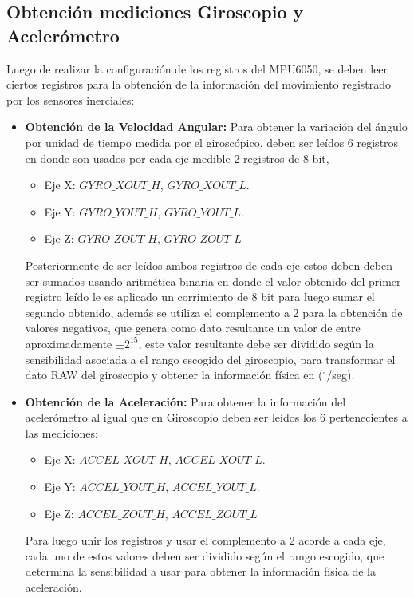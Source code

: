 \documentclass[12pt,a4paper]{article}
\newcommand{\grad}{$^{\circ}$}
\begin{document}
\subsection{Obtención mediciones Giroscopio y Acelerómetro}
Luego de realizar la configuración de los registros del MPU6050, se deben leer ciertos registros para la obtención de la información del movimiento registrado por los sensores inerciales:

\begin{itemize}
\item \textbf{Obtención de la Velocidad Angular:} Para obtener la variación del ángulo por unidad de tiempo medida por el giroscópico, deben ser leídos 6 registros en donde son usados por cada eje medible 2 registros de 8 bit,
\begin{itemize}
	\item Eje X: $GYRO\_XOUT\_H$, $GYRO\_XOUT\_L$.
	\item Eje Y: $GYRO\_YOUT\_H$, $GYRO\_YOUT\_L$.
	\item Eje Z: $GYRO\_ZOUT\_H$, $GYRO\_ZOUT\_L$
\end{itemize}
Posteriormente de ser leídos ambos registros de cada eje estos deben deben ser sumados usando aritmética binaria en donde el valor obtenido del primer registro leído le es aplicado un corrimiento de 8 bit para luego sumar el segundo obtenido, además se utiliza el complemento a 2 para la obtención de valores negativos, que genera como dato resultante un valor de entre aproximadamente $\pm 2^{15}$, este valor resultante debe ser dividido según la sensibilidad asociada a el rango escogido del giroscopio, para transformar el dato RAW del giroscopio y obtener la información física en (\grad/seg).

\item \textbf{Obtención de la Aceleración:} Para obtener la información del acelerómetro al igual que en Giroscopio deben ser leídos los 6 pertenecientes a las mediciones:
\begin{itemize}
	\item Eje X: $ACCEL\_XOUT\_H$, $ACCEL\_XOUT\_L$.
	\item Eje Y: $ACCEL\_YOUT\_H$, $ACCEL\_YOUT\_L$.
	\item Eje Z: $ACCEL\_ZOUT\_H$, $ACCEL\_ZOUT\_L$
\end{itemize}

Para luego unir los registros y usar el complemento a 2 acorde a cada eje, cada uno de estos valores deben ser dividido según el rango escogido, que determina la sensibilidad a usar para obtener la información física de la aceleración.


\end{itemize}
\end{document}
